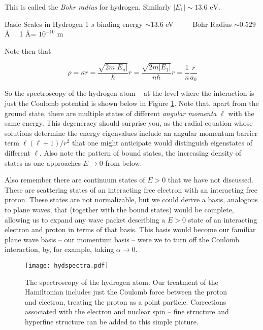 This is called the \textit{Bohr radius} for hydrogen. Similarly $|E_1| \sim
13.6 \text{ eV} $. 

\begin{mainbox}{Basic Scales in Hydrogen}
  1 $s$ binding energy $\sim 13.6$ eV $\qquad$ Bohr Radius  $\sim 0.529 $ \AA
  $\quad $1 \AA = $10^{-10}$ m
\end{mainbox}

Note then that 

\[
\rho = \kappa r = \frac{\sqrt{2m|E_n|}}{\hbar}
r = \frac{\sqrt{2m|E_1|}}{n\hbar} r = \frac{1}{n} \frac{r}{a_0}
\] \vspace{3px}

So the spectroscopy of the hydrogen atom -- at the level where the interaction
is just the Coulomb potential is shown below in Figure \ref{hydspectra}. Note
that, apart from the ground state, there are multiple states of different
\textit{angular momenta} $\ell $ with the same energy. This degeneracy should surprise
you, as the radial equation whose solutions determine the energy eigenvalues
include an angular momentum barrier term $\ell (\ell +1) / r^2$ that one might
anticipate would distinguish eigenstates of different $\ell $. Also note the
pattern of bound states, the increasing density of states as one approaches $E
\rightarrow 0$ from below. 

Also remember there are continuum states of $E > 0$ that we have not discussed.
These are scattering states of an interacting free electron with an interacting
free proton. These states are not normalizable, but we could derive a basis,
analogous to plane waves, that (together with the bound states) would be
complete, allowing us to expand any wave packet describing a $E>0$ state of an
interacting electron and proton in terms of that basis. This basis would become
our familiar plane wave basis -- our momentum basis -- were we to turn off the
Coulomb interaction, by, for example, taking $\alpha \rightarrow 0$. 



\vspace{5px}

\begin{figure}[H]
  \centering
    \texttt{[image: hydspectra.pdf]}
    \caption{The spectroscopy of the hydrogen atom. Our treatment of the
      Hamiltonian includes just the Coulomb force between the proton and
      electron, treating the proton as a point particle. Corrections associated
      with the electron and nuclear spin -- fine structure and hyperfine
    structure can be added to this simple picture.}
    \label{hydspectra}
\end{figure}

